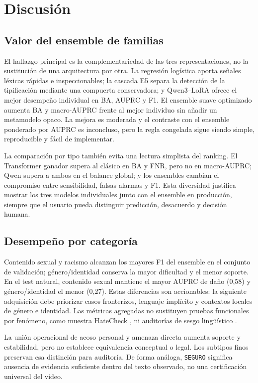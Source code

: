 \section{Discusión}

\subsection{Valor del ensemble de familias}

El hallazgo principal es la complementariedad de las tres representaciones, no la sustitución de una arquitectura por otra. La regresión logística aporta señales léxicas rápidas e inspeccionables; la cascada E5 separa la detección de la tipificación mediante una compuerta conservadora; y Qwen3--LoRA ofrece el mejor desempeño individual en BA, AUPRC y F1. El ensemble suave optimizado aumenta BA y macro-AUPRC frente al mejor individuo sin añadir un metamodelo opaco. La mejora es moderada y el contraste con el ensemble ponderado por AUPRC es inconcluso, pero la regla congelada sigue siendo simple, reproducible y fácil de implementar.

La comparación por tipo también evita una lectura simplista del ranking. El Transformer ganador supera al clásico en BA y FNR, pero no en macro-AUPRC; Qwen supera a ambos en el balance global; y los ensembles cambian el compromiso entre sensibilidad, falsas alarmas y F1. Esta diversidad justifica mostrar los tres modelos individuales junto con el ensemble en producción, siempre que el usuario pueda distinguir predicción, desacuerdo y decisión humana.

\subsection{Desempeño por categoría}

Contenido sexual y racismo alcanzan los mayores F1 del ensemble en el conjunto de validación; género/identidad conserva la mayor dificultad y el menor soporte. En el test natural, contenido sexual mantiene el mayor AUPRC de daño (0,58) y género/identidad el menor (0,27). Estas diferencias son accionables: la siguiente adquisición debe priorizar casos fronterizos, lenguaje implícito y contextos locales de género e identidad. Las métricas agregadas no sustituyen pruebas funcionales por fenómeno, como muestra HateCheck \cite{rottger2021hatecheck}, ni auditorías de sesgo lingüístico \cite{sap2019racialbias}.

La unión operacional de acoso personal y amenaza directa aumenta soporte y estabilidad, pero no establece equivalencia conceptual o legal. Los subtipos finos preservan esa distinción para auditoría. De forma análoga, \texttt{SEGURO} significa ausencia de evidencia suficiente dentro del texto observado, no una certificación universal del video.

